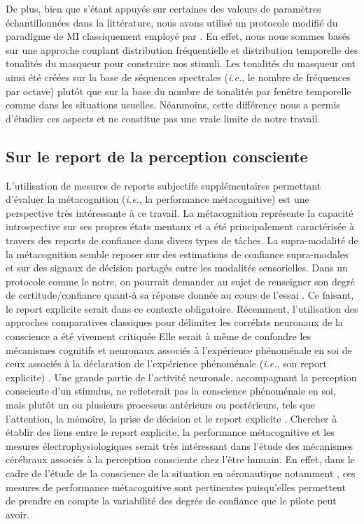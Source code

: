 De plus, bien que s'étant appuyés sur certaines des valeurs de paramètres échantillonnées dans la littérature, nous avons utilisé un protocole modifié du paradigme de MI classiquement employé par \cite{dykstra2016neural, gutschalk2008neural, neff1987masking, wiegand2012correlates, wiegand2018cortical}.
En effet, nous nous sommes basés sur une approche couplant distribution fréquentielle et distribution temporelle des tonalités du masqueur pour construire nos stimuli. 
Les tonalités du masqueur ont ainsi été créées sur la base de séquences spectrales (\textit{i.e.}, le nombre de fréquences par octave) plutôt que sur la base du nombre de tonalités par fenêtre temporelle comme dans les situations usuelles. 
Néanmoins, cette différence nous a permis d'étudier ces aspects et ne constitue pas une vraie limite de notre travail. 

\subsection{Sur le report de la perception consciente}

L'utilisation de mesures de reports subjectifs supplémentaires permettant d'évaluer la métacognition (\textit{i.e.}, la performance métacognitive) est une perspective très intéressante à ce travail. 
La métacognition représente la capacité introspective sur ses propres états mentaux et a été principalement caractérisée à travers des reports de confiance dans divers types de tâches. 
La supra-modalité de la métacognition semble reposer sur des estimations de confiance supra-modales et sur des signaux de décision partagés entre les modalités sensorielles. 
Dans un protocole comme le notre, on pourrait demander au sujet de renseigner son degré de certitude/confiance quant-à sa réponse donnée au cours de l'essai \citep{khamassi2021neurosciences, pereira2021evidence}. 
Ce faisant, le report explicite serait dans ce contexte obligatoire. 
Récemment, l'utilisation des approches comparatives classiques pour délimiter les corrélats neuronaux de la conscience a été vivement critiquée \citep{aru2012distilling, tsuchiya2016no}
Elle serait à même de confondre les mécanismes cognitifs et neuronaux associés à l'expérience phénoménale en soi de ceux associés à la déclaration de l'expérience phénoménale (\textit{i.e.}, son report explicite) \citep{aru2012distilling}. 
Une grande partie de l'activité neuronale, accompagnant la perception consciente d'un stimulus, ne refleterait pas la conscience phénoménale en soi, mais plutôt un ou plusieurs processus antérieurs ou postérieurs, tels que l'attention, la mémoire, la prise de décision et le report explicite \citep{dembski2021perceptual}. 
Chercher à établir des liens entre le report explicite, la performance métacognitive et les mesures électrophysiologiques serait très intéressant dans l'étude des mécanismes cérébraux associés à la perception consciente chez l'être humain. 
En effet, dans le cadre de l'étude de la conscience de la situation en aéronautique notamment \citep{endsley1999level, endsley2017here}, ces mesures de performance métacognitive sont pertinentes puisqu'elles permettent de prendre en compte la variabilité des degrés de confiance que le pilote peut avoir. 

